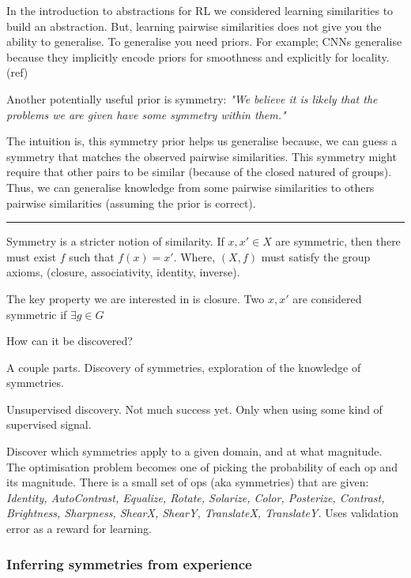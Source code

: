 
 In the introduction to abstractions for RL we considered learning similarities
 to build an abstraction. But, learning pairwise similarities does not give
 you the ability to generalise. To generalise you need priors. For example;
 CNNs generalise because they implicitly encode priors for smoothness and explicitly for locality. (ref)

 Another potentially useful prior is symmetry: \textit{"We believe it is likely that
 the problems we are given have some symmetry within them."}

 The intuition is, this symmetry prior helps us generalise because, we can guess
 a symmetry that matches the observed pairwise similarities. This symmetry might
 require that other pairs to be similar (because of the closed natured of groups).
 Thus, we can generalise knowledge from some pairwise similarities to others
 pairwise similarities (assuming the prior is correct).


 \begin{center}\rule{0.5\linewidth}{\linethickness}\end{center}


 Symmetry is a stricter notion of similarity.
 If $x, x' \in X$ are symmetric, then there must exist $f$ such that $f(x) = x'$.
 Where, $(X, f)$ must satisfy the group axioms, (closure, associativity, identity, inverse).

 The key property we are interested in is closure.
 Two $x, x'$ are considered symmetric if $\exists g\in G$


 How can it be discovered?

 A couple parts. Discovery of symmetries, exploration of the knowledge of symmetries.

 Unsupervised discovery. Not much success yet. Only when using some kind of supervised signal.

 \cite{Ho2019a, Lim2019, Cubuk2018, Cubuk2019}
 Discover which symmetries apply to a given domain, and at what magnitude.
 The optimisation problem becomes one of picking the probability of each op and its magnitude.
 There is a small set of ops (aka symmetries) that are given:
 \textit{Identity, AutoContrast, Equalize, Rotate, Solarize, Color, Posterize, Contrast,
 	Brightness, Sharpness, ShearX, ShearY, TranslateX, TranslateY.}
 Uses validation error as a reward for learning.

 \subsubsection{Inferring symmetries from experience}


